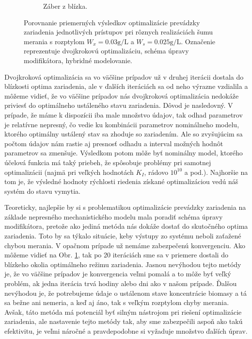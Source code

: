 \begin{figure}
\begin{subfigure}[b]{0.49\textwidth}
		\caption{Záber z blízka. \newline \newline}
		\label{fig:opt_approaches_comparison_zoomed}
	\end{subfigure}
	\caption{Porovnanie priemerných výsledkov optimalizácie prevádzky zariadenia jednotlivých prístupov pri rôznych realizáciách šumu merania s rozptylom $ W_{x} = 0.03\si{\gram\per\liter} $ a $ W_{s} = 0.025\si{\gram\per\liter} $. Označenie  reprezentuje dvojkrokovú optimalizáciu,  schéma úpravy modifikátora,  hybridné modelovanie.}
	\label{fig:method_comparison_bigNoise}
\end{figure}

Dvojkroková optimalizácia sa vo väčšine prípadov už v druhej iterácii dostala do blízkosti optima zariadenia, ale v ďalších iteráciách sa od neho výrazne vzdialila a môžeme vidieť, že vo väčšine prípadov nás dvojkroková optimalizácia nedokáže priviesť do optimálneho ustáleného stavu zariadenia. Dôvod je nasledovný. V prípade, že máme k dispozícii iba male množstvo údajov, tak odhad parametrov je relatívne nepresný, čo vedie ku kombinácii parametrov nominálneho modelu, ktorého optimálny ustálený stav sa zhoduje so zariadením. Ale so zvyšujúcim sa počtom údajov nám rastie aj presnosť odhadu a interval možných hodnôt parametrov sa zmenšuje. Výsledkom potom môže byť nominálny model, ktorého účelová funkcia má taký priebeh, že spôsobuje problémy pri samotnej optimalizácii (najmä pri veľkých hodnotách $ K_I $, rádovo $ 10^{10} $ a pod.). Najhoršie na tom je, že výsledné hodnoty rýchlosti riedenia získané optimalizáciou vedú náš systém do stavu vymytia.

Teoreticky, najlepšie by si s problematikou optimalizácie prevádzky zariadenia na základe nepresného mechanistického modelu mala poradiť schéma úpravy modifikátora, pretože ako jediná metóda nás dokáže dostať do skutočného optima zariadenia. Toto by sa týkalo situácie, keby výstupy zo systému neboli zaťažené chybou merania. V opačnom prípade už nemáme zabezpečenú konvergenciu. Ako môžeme vidieť na Obr. \ref{fig:opt_approaches_comparison_zoomed}, tak po 20 iteráciách sme sa v priemere dostali do blízkeho okolia optimálneho režimu zariadenia. Jasnou nevýhodou tejto metódy je, že vo väčšine prípadov je konvergencia veľmi pomalá a to môže byť veľký problém, ak jedna iterácia trvá hodiny alebo dni ako v našom prípade. Ďalšou nevýhodou je, že potrebujeme údaje o ustálenom stave koncentrácie biomasy a tá sa bežne ani nemeria, a keď aj áno, tak s veľkým rozptylom chyby merania. Avšak, táto metóda má potenciál byť silným nástrojom pri riešení optimalizácie zariadenia, ale nastavenie tejto metódy tak, aby sme zabezpečili aspoň ako takú efektivitu, je veľmi náročné a pravdepodobne si vyžaduje množstvo ďalších úprav.

